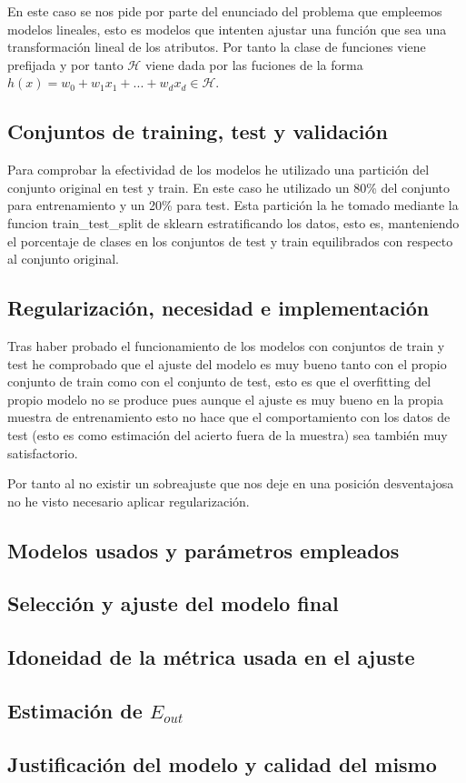 \documentclass[12pt,a4paper]{article}
\begin{document}
En este caso se nos pide por parte del enunciado del problema que empleemos modelos lineales, esto es modelos que intenten ajustar una función que sea una transformación lineal de los atributos. Por tanto la clase de funciones viene prefijada y por tanto $\mathcal{H}$ viene dada por las fuciones de la forma $h(x) = w_0 + w_1 x_1 + ... + w_d x_d \in \mathcal{H}$.

\subsection{Conjuntos de training, test y validación}

Para comprobar la efectividad de los modelos he utilizado una partición del conjunto original en test y train. En este caso he utilizado un 80\% del conjunto para entrenamiento y un 20\% para test. Esta partición la he tomado mediante la funcion train\_test\_split de sklearn estratificando los datos, esto es, manteniendo el porcentaje de clases en los conjuntos de test y train equilibrados con respecto al conjunto original.

\subsection{Regularización, necesidad e implementación}

Tras haber probado el funcionamiento de los modelos con conjuntos de train y test he comprobado que el ajuste del modelo es muy bueno tanto con el propio conjunto de train como con el conjunto de test, esto es que el overfitting del propio modelo no se produce pues aunque el ajuste es muy bueno en la propia muestra de entrenamiento esto no hace que el comportamiento con los datos de test (esto es como estimación del acierto fuera de la muestra) sea también muy satisfactorio.

Por tanto al no existir un sobreajuste que nos deje en una posición desventajosa no he visto necesario aplicar regularización.

\subsection{Modelos usados y parámetros empleados}

\subsection{Selección y ajuste del modelo final}

\subsection{Idoneidad de la métrica usada en el ajuste}

\subsection{Estimación de $E_{out}$}

\subsection{Justificación del modelo y calidad del mismo}
\end{document}
